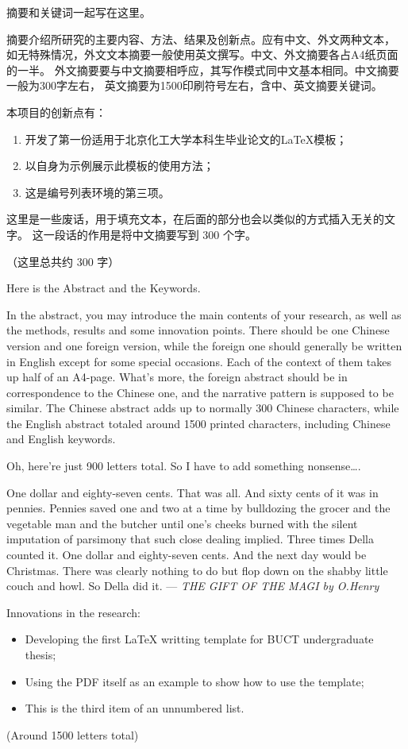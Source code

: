 \begin{cabstract}
	摘要和关键词一起写在这里。

	摘要介绍所研究的主要内容、方法、结果及创新点。应有中文、外文两种文本，
	如无特殊情况，外文文本摘要一般使用英文撰写。中文、外文摘要各占A4纸页面的一半。
	外文摘要要与中文摘要相呼应，其写作模式同中文基本相同。中文摘要一般为300字左右，
	英文摘要为1500印刷符号左右，含中、英文摘要关键词。

	本项目的创新点有：
	\begin{enumerate}
		\item 开发了第一份适用于北京化工大学本科生毕业论文的\LaTeX{}模板；
		\item 以自身为示例展示此模板的使用方法；
		\item 这是编号列表环境的第三项。
	\end{enumerate}

	这里是一些废话，用于填充文本，在后面的部分也会以类似的方式插入无关的文字。
	这一段话的作用是将中文摘要写到 300 个字。

	（这里总共约 300 字）
\end{cabstract}

\begin{eabstract}
	Here is the Abstract and the Keywords.

	In the abstract, you may introduce the main contents of your research,
	as well as the methods, results and some innovation points. There should
	be one Chinese version and one foreign version, while the foreign one
	should generally be written in English except for some special occasions.
	Each of the context of them takes up half of an A4-page. What's more,
	the foreign abstract should be in correspondence to the Chinese one,
	and the narrative pattern is supposed to be similar. The Chinese abstract
	adds up to normally 300 Chinese characters, while the English abstract
	totaled around 1500 printed characters, including Chinese and English keywords.

	Oh, here're just 900 letters total. So I have to add something nonsense\dots.

	One dollar and eighty-seven cents. That was all. And sixty cents of it was
	in pennies. Pennies saved one and two at a time by bulldozing the grocer
	and the vegetable man and the butcher until one's cheeks burned with the
	silent imputation of parsimony that such close dealing implied. Three times
	Della counted it. One dollar and eighty-seven cents. And the next day would
	be Christmas. There was clearly nothing to do but flop down on the shabby
	little couch and howl. So Della did it.
	\hfill --- \textit{THE GIFT OF THE MAGI by O.Henry}

	Innovations in the research:
	\begin{itemize}
		\item Developing the first \LaTeX{} writting template for BUCT undergraduate thesis;
		\item Using the PDF itself as an example to show how to use the template;
		\item This is the third item of an unnumbered list.
	\end{itemize}

	(Around 1500 letters total)
\end{eabstract}